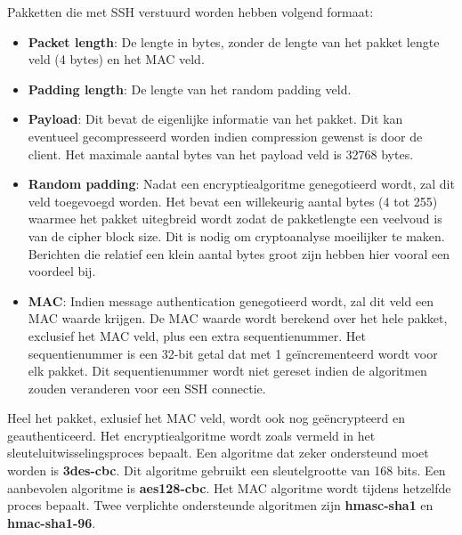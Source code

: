 Pakketten die met SSH verstuurd worden hebben volgend formaat:
	\begin{itemize}
		\item \textbf{Packet length}: De lengte in bytes, zonder de lengte van het pakket lengte veld (4 bytes) en het MAC veld.
		\item \textbf{Padding length}: De lengte van het random padding veld.
		\item \textbf{Payload}: Dit bevat de eigenlijke informatie van het pakket. Dit kan eventueel gecompresseerd worden indien compression gewenst is door de client. Het maximale aantal bytes van het payload veld is 32768 bytes.
		\item \textbf{Random padding}: Nadat een encryptiealgoritme genegotieerd wordt, zal dit veld toegevoegd worden. Het bevat een willekeurig aantal bytes (4 tot 255) waarmee het pakket uitegbreid wordt zodat de pakketlengte een veelvoud is van de cipher block size. Dit is nodig om cryptoanalyse moeilijker te maken. Berichten die relatief een klein aantal bytes groot zijn hebben hier vooral een voordeel bij.
		\item \textbf{MAC}: Indien message authentication genegotieerd wordt, zal dit veld een MAC waarde krijgen. De MAC waarde wordt berekend over het hele pakket, exclusief het MAC veld, plus een extra sequentienummer. Het sequentienummer is een 32-bit getal dat met 1 geïncrementeerd wordt voor elk pakket. Dit sequentienummer wordt niet gereset indien de algoritmen zouden veranderen voor een SSH connectie.
	\end{itemize}
	Heel het pakket, exlusief het MAC veld, wordt ook nog geëncrypteerd en geauthenticeerd. Het encryptiealgoritme wordt zoals vermeld in het sleuteluitwisselingsproces bepaalt. Een algoritme dat zeker ondersteund moet worden is \textbf{3des-cbc}. Dit algoritme gebruikt een sleutelgrootte van 168 bits. Een aanbevolen algoritme is \textbf{aes128-cbc}. Het MAC algoritme wordt tijdens hetzelfde proces bepaalt. Twee verplichte ondersteunde algoritmen zijn \textbf{hmasc-sha1} en \textbf{hmac-sha1-96}. 
